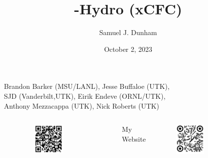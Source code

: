 \documentclass{beamer}
\title[SXS NR Community Call]{\thornado-Hydro (xCFC)}
\author{Samuel J. Dunham}
\date{October 2, 2023}
\begin{document}
\begin{frame}

  \titlepage

  \begin{center}
    Brandon Barker (MSU/LANL), %
    Jesse Buffaloe (UTK), \\
    SJD (Vanderbilt,UTK), %
    Eirik Endeve (ORNL/UTK), \\
    Anthony Mezzacappa (UTK), %
    Nick Roberts (UTK)
  \end{center}

  \vspace{-1em}

  \begin{columns}[c]

      \begin{center}\thornado\end{center}
      \vspace{-1.5em}
      \begin{figure}[htb!]
        \centering
        \includegraphics[width=0.5\textwidth]{fig.thornado.png}
      \end{figure}

      \begin{center}My Website\end{center}
      \vspace{-1.5em}
      \begin{figure}[htb!]
        \centering
        \includegraphics[width=0.5\textwidth]{fig.website.png}
      \end{figure}

  \end{columns}

\end{frame}
\end{document}
